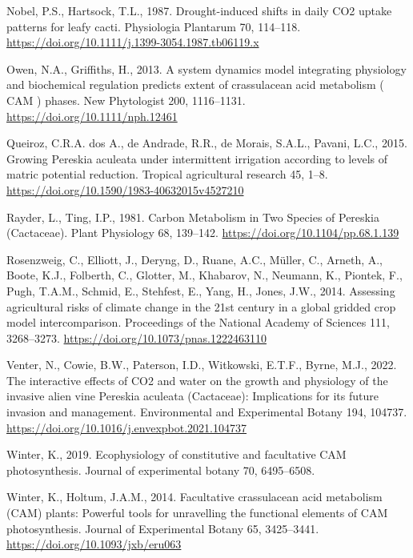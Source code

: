 \documentclass[
  12pt,
  letterpaper,
  DIV=11,
  numbers=noendperiod]{scrartcl}
\newlength{\cslhangindent}
\newlength{\cslentryspacingunit} %
\newenvironment{CSLReferences}[2] %
 {%
  \setlength{\parindent}{0pt}
  \ifodd #1
  \let\oldpar\par
  \def\par{\hangindent=\cslhangindent\oldpar}
  \fi
  \setlength{\parskip}{#2\cslentryspacingunit}
 }%
 {}
\begin{document}
\begin{CSLReferences}{1}{0}
\leavevmode{}%
Nobel, P.S., Hartsock, T.L., 1987. Drought-induced shifts in daily {CO2}
uptake patterns for leafy cacti. Physiologia Plantarum 70, 114--118.
\url{https://doi.org/10.1111/j.1399-3054.1987.tb06119.x}

\leavevmode{}%
Owen, N.A., Griffiths, H., 2013. A system dynamics model integrating
physiology and biochemical regulation predicts extent of crassulacean
acid metabolism ( CAM ) phases. New Phytologist 200, 1116--1131.
\url{https://doi.org/10.1111/nph.12461}

\leavevmode{}%
Queiroz, C.R.A. dos A., de Andrade, R.R., de Morais, S.A.L., Pavani,
L.C., 2015. Growing {Pereskia} aculeata under intermittent irrigation
according to levels of matric potential reduction. Tropical agricultural
research 45, 1--8. \url{https://doi.org/10.1590/1983-40632015v4527210}

\leavevmode{}%
Rayder, L., Ting, I.P., 1981. Carbon {Metabolism} in {Two Species} of
{Pereskia} ({Cactaceae}). Plant Physiology 68, 139--142.
\url{https://doi.org/10.1104/pp.68.1.139}

\leavevmode{}%
Rosenzweig, C., Elliott, J., Deryng, D., Ruane, A.C., Müller, C.,
Arneth, A., Boote, K.J., Folberth, C., Glotter, M., Khabarov, N.,
Neumann, K., Piontek, F., Pugh, T.A.M., Schmid, E., Stehfest, E., Yang,
H., Jones, J.W., 2014. Assessing agricultural risks of climate change in
the 21st century in a global gridded crop model intercomparison.
Proceedings of the National Academy of Sciences 111, 3268--3273.
\url{https://doi.org/10.1073/pnas.1222463110}

\leavevmode{}%
Venter, N., Cowie, B.W., Paterson, I.D., Witkowski, E.T.F., Byrne, M.J.,
2022. The interactive effects of {CO2} and water on the growth and
physiology of the invasive alien vine {Pereskia} aculeata ({Cactaceae}):
{Implications} for its future invasion and management. Environmental and
Experimental Botany 194, 104737.
\url{https://doi.org/10.1016/j.envexpbot.2021.104737}

\leavevmode{}%
Winter, K., 2019. Ecophysiology of constitutive and facultative {CAM}
photosynthesis. Journal of experimental botany 70, 6495--6508.

\leavevmode{}%
Winter, K., Holtum, J.A.M., 2014. Facultative crassulacean acid
metabolism ({CAM}) plants: {Powerful} tools for unravelling the
functional elements of {CAM} photosynthesis. Journal of Experimental
Botany 65, 3425--3441. \url{https://doi.org/10.1093/jxb/eru063}

\end{CSLReferences}
\end{document}

